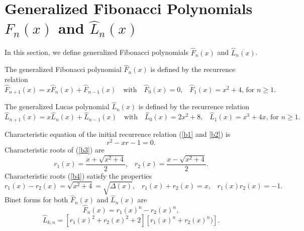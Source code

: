 \section{Generalized Fibonacci Polynomials $\widehat{F}_{ n}(x)$ and $\widehat{L}_{n}(x)$}
In this section, we define generalized Fibonacci polynomials  $\widehat{F}_{ n}(x)$ and $\widehat{L}_{n}(x)$.
\begin{definition}
The generalized Fibonacci polynomial $\widehat{F}_{ n}(x)$ is defined by the recurrence relation 
\begin{equation*}\label{b1}
\widehat{F}_{ n+1}(x)=x\widehat{F}_{n}(x)+\widehat{F}_{ n-1}(x) \quad\text{with} \quad \widehat{F}_{ 0}(x)=0\text{,}\quad \widehat{F}_{1}(x)=x^2+4\text{, for } n\geq{1}.
\end{equation*}
\end{definition}
\begin{definition}
The generalized Lucas polynomial $\widehat{L}_{ n}(x)$ is defined by the recurrence relation 
\begin{equation*}\label{b2}
\widehat{L}_{ n+1}(x)=x \widehat{L}_{ n}(x)+\widehat{L}_{ n-1}(x) \quad\text{with} \quad \widehat{L}_{ 0}(x)=2x^2+8\text{,}\quad \widehat{L}_{ 1}(x)=x^3+4x\text{, for } n\geq{1}.
\end{equation*}
\end{definition}
\noindent Characteristic equation of the initial recurrence relation (\ref{b1} and \ref{b2}) is
\begin{equation*}\label{b3}
r^{2}-xr-1=0. 
\end{equation*} 
Characteristic roots of (\ref{b3}) are
\begin{equation*}\label{b4}
 r_{1}(x)=\frac{x+\sqrt{x^2+4}}{2} \text{,}\quad r_{2}(x)=\frac{x-\sqrt{x^2+4}}{2}.
\end{equation*}
 Characteristic roots (\ref{b4}) satisfy the properties
  \begin{equation*}\label{b5} 
   r_{1}(x)-r_{2}(x) = \sqrt{x^{2}+4} = \sqrt{\Delta(x)}\text{,}
 \quad r_{1}(x)+r_{2}(x)=x\text{,}\quad r_{1}(x)r_{2}(x)=-1.
\end{equation*}   
Binet forms for both  $\widehat{F}_{n}(x)$ and $\widehat{L}_{n}(x)$ are \begin{equation}\label{b6} 
\widehat{F}_{n}(x)= {r_{1}(x)}^n - {r_{2}(x)}^n,
\end{equation}
\begin{equation}\label{b7} 
\widehat{L}_{k,n}= \left[ r_{1}(x)^2+r_{2}(x)^2+2\right]\left[ r_{1}(x)^n+r_{2}(x)^n)\right]. 
\end{equation}
